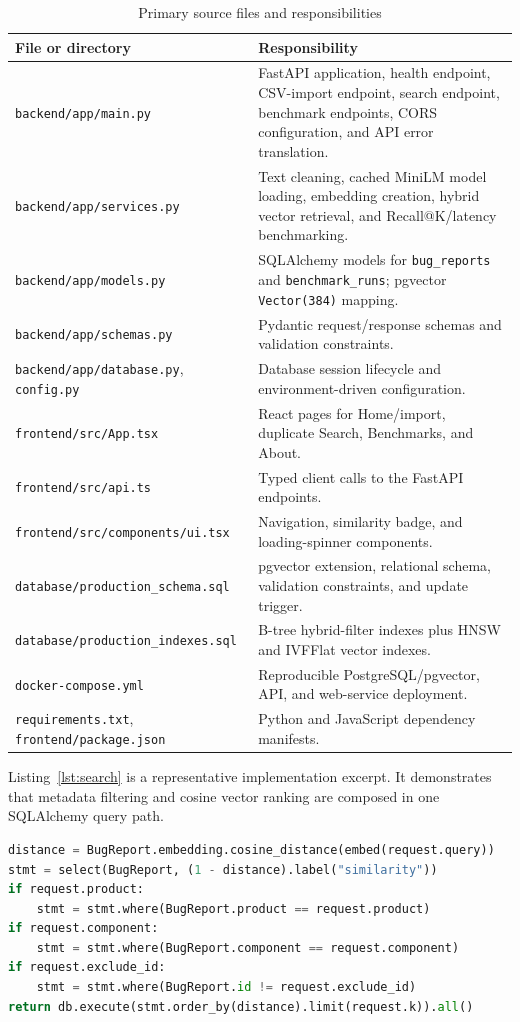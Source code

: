 \documentclass[conference]{IEEEtran}
\begin{document}
\begin{table}[!t]
\caption{Primary source files and responsibilities}
\label{tab:source}
\centering
\begin{tabular}{p{}p{}}
\toprule
\textbf{File or directory} & \textbf{Responsibility}\\
\midrule
\texttt{backend/app/main.py} & FastAPI application, health endpoint, CSV-import endpoint, search endpoint, benchmark endpoints, CORS configuration, and API error translation.\\
\texttt{backend/app/services.py} & Text cleaning, cached MiniLM model loading, embedding creation, hybrid vector retrieval, and Recall@K/latency benchmarking.\\
\texttt{backend/app/models.py} & SQLAlchemy models for \texttt{bug\_reports} and \texttt{benchmark\_runs}; pgvector \texttt{Vector(384)} mapping.\\
\texttt{backend/app/schemas.py} & Pydantic request/response schemas and validation constraints.\\
\texttt{backend/app/database.py}, \texttt{config.py} & Database session lifecycle and environment-driven configuration.\\
\texttt{frontend/src/App.tsx} & React pages for Home/import, duplicate Search, Benchmarks, and About.\\
\texttt{frontend/src/api.ts} & Typed client calls to the FastAPI endpoints.\\
\texttt{frontend/src/components/ui.tsx} & Navigation, similarity badge, and loading-spinner components.\\
\texttt{database/production\_schema.sql} & pgvector extension, relational schema, validation constraints, and update trigger.\\
\texttt{database/production\_indexes.sql} & B-tree hybrid-filter indexes plus HNSW and IVFFlat vector indexes.\\
\texttt{docker-compose.yml} & Reproducible PostgreSQL/pgvector, API, and web-service deployment.\\
\texttt{requirements.txt}, \texttt{frontend/package.json} & Python and JavaScript dependency manifests.\\
\bottomrule
\end{tabular}
\end{table}

Listing~\ref{lst:search} is a representative implementation excerpt. It demonstrates that metadata filtering and cosine vector ranking are composed in one SQLAlchemy query path.
\begin{lstlisting}[caption={Hybrid vector-retrieval excerpt from \texttt{services.py}.},label={lst:search},language=Python]
distance = BugReport.embedding.cosine_distance(embed(request.query))
stmt = select(BugReport, (1 - distance).label("similarity"))
if request.product:
    stmt = stmt.where(BugReport.product == request.product)
if request.component:
    stmt = stmt.where(BugReport.component == request.component)
if request.exclude_id:
    stmt = stmt.where(BugReport.id != request.exclude_id)
return db.execute(stmt.order_by(distance).limit(request.k)).all()
\end{lstlisting}
\end{document}
